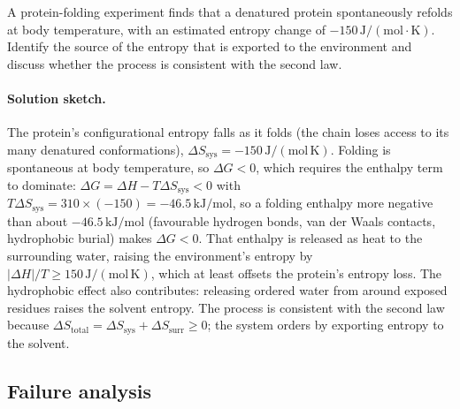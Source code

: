 \begin{exercise}
A protein-folding experiment finds that a denatured protein
spontaneously refolds at body temperature, with an estimated entropy
change of $-150\,\text{J}/(\text{mol}\cdot\si{\kelvin})$. Identify
the source of the entropy that is exported to the environment and
discuss whether the process is consistent with the second law.

\paragraph{Solution sketch.} The protein's configurational entropy
falls as it folds (the chain loses access to its many denatured
conformations), $\Delta S_{\text{sys}} = -150\,\text{J}/(\text{mol}\,
\si{\kelvin})$. Folding is spontaneous at body temperature, so
$\Delta G < 0$, which requires the enthalpy term to dominate:
$\Delta G = \Delta H - T\Delta S_{\text{sys}} < 0$ with
$T\Delta S_{\text{sys}} = 310\times(-150) = -46.5\,\text{kJ}/\text{mol}$,
so a folding enthalpy more negative than about
$-46.5\,\text{kJ}/\text{mol}$ (favourable hydrogen bonds, van der Waals
contacts, hydrophobic burial) makes $\Delta G < 0$. That enthalpy is
released as heat to the surrounding water, raising the environment's
entropy by $|\Delta H|/T \ge 150\,\text{J}/(\text{mol}\,\si{\kelvin})$,
which at least offsets the protein's entropy loss. The hydrophobic
effect also contributes: releasing ordered water from around exposed
residues raises the solvent entropy. The process is consistent with the
second law because $\Delta S_{\text{total}} = \Delta S_{\text{sys}} +
\Delta S_{\text{surr}} \ge 0$; the system orders by exporting entropy to
the solvent.
\end{exercise}

\subsection*{Failure analysis}

